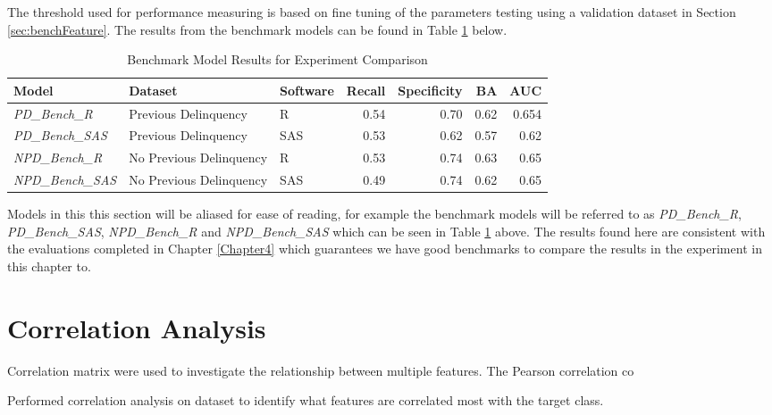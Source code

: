 The threshold used for performance measuring is based on fine tuning of the parameters testing using a validation dataset in Section \ref{sec:benchFeature}. The results from the benchmark models can be found in Table \ref{table:benchmodel} below.

\begin{table}[H]
	\centering
	\resizebox{\textwidth}{!}
	{\footnotesize
		\begin{tabular}{l l l r r r r}
			\hline
			\textbf{Model} & \textbf{Dataset} & \textbf{Software} & \textbf{Recall} & \textbf{Specificity} & \textbf{BA} & \textbf{AUC}  \\ \hline
			\textit{PD\_Bench\_R} & Previous Delinquency & R & 0.54 & 0.70 & 0.62 & 0.654   \\ 
			\textit{PD\_Bench\_SAS} & Previous Delinquency & SAS & 0.53 & 0.62 & 0.57 & 0.62   \\ \hline
			\textit{NPD\_Bench\_R} & No Previous Delinquency & R & 0.53 & 0.74 & 0.63 & 0.65   \\ 
			\textit{NPD\_Bench\_SAS} & No Previous Delinquency & SAS & 0.49 & 0.74 & 0.62 & 0.65   \\ \hline
		\end{tabular}
	}
	\caption{Benchmark Model Results for Experiment Comparison}
	\label{table:benchmodel}
\end{table}

Models in this this section will be aliased for ease of reading, for example the benchmark models will be referred to as \textit{PD\_Bench\_R}, \textit{PD\_Bench\_SAS}, \textit{NPD\_Bench\_R} and \textit{NPD\_Bench\_SAS} which can be seen in Table \ref{table:benchmodel} above. The results found here are consistent with the evaluations completed in Chapter \ref{Chapter4} which guarantees we have good benchmarks to compare the results in the experiment in this chapter to.


\section{Correlation Analysis}
Correlation matrix were used to investigate the relationship between multiple features. The Pearson correlation co


Performed correlation analysis on dataset to identify what features are correlated most with the target class. 

